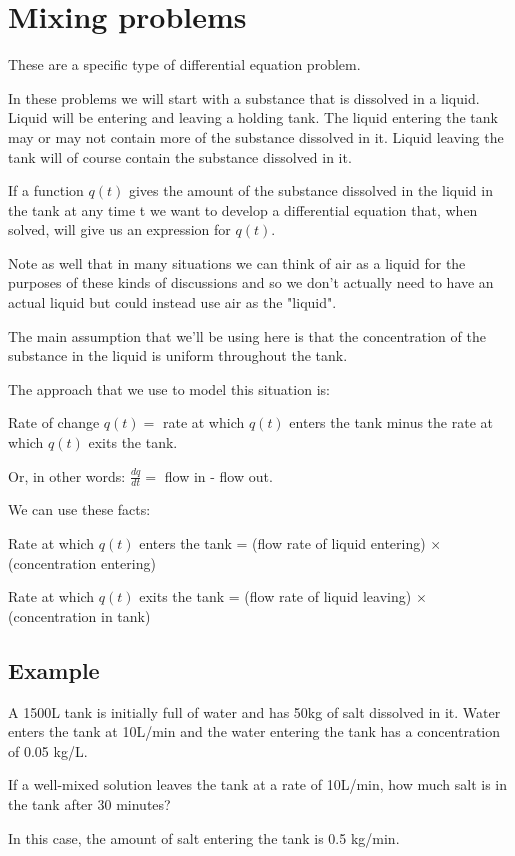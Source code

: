 \documentclass[../main.tex]{subfiles}
\begin{document}
\section{Mixing problems}
These are a specific type of differential equation problem.

In these problems we will start with a substance that is dissolved in a liquid. Liquid will be entering and leaving a holding tank. The liquid entering the tank may or may not contain more of the substance dissolved in it. Liquid leaving the tank will of course contain the substance dissolved in it. 

If a function $q(t)$ gives the amount of the substance dissolved in the liquid in the tank at any time t we want to develop a differential equation that, when solved, will give us an expression for $q(t)$.

Note as well that in many situations we can think of air as a liquid for the purposes of these kinds of discussions and so we don't actually need to have an actual liquid but could instead use air as the "liquid".

The main assumption that we'll be using here is that the concentration of the substance in the liquid is uniform throughout the tank.

The approach that we use to model this situation is:

Rate of change $q(t)=$ rate at which $q(t)$ enters the tank minus the rate at which $q(t)$ exits the tank.

Or, in other words: $\frac{dq}{dt}=$ flow in - flow out.

We can use these facts:

Rate at which $q(t)$ enters the tank = (flow rate of liquid entering) $\times$ (concentration entering)

Rate at which $q(t)$ exits the tank = (flow rate of liquid leaving) $\times$ (concentration in tank)

\subsection*{Example}
A 1500L tank is initially full of water and has 50kg of salt dissolved in it. Water enters the tank at 10L/min and the water entering the tank has a concentration of 0.05 kg/L. 

If a well-mixed solution leaves the tank at a rate of 10L/min, how much salt is in the tank after 30 minutes?

In this case, the amount of salt entering the tank is 0.5 kg/min.
\end{document}
